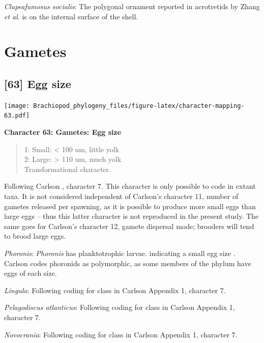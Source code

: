 \documentclass[]{book}
\theoremstyle{definition}
\theoremstyle{definition}
\theoremstyle{definition}
\theoremstyle{remark}
\begin{document}
\emph{Clupeafumosus socialis}: The polygonal ornament reported in
acrotretids by Zhang \emph{et al}. \citeyearpar{Zhang2016Epithelialcell}
is on the internal surface of the shell.

\hypertarget{gametes}{%
\section{Gametes}\label{gametes}}

\hypertarget{egg-size}{%
\subsection*{{[}63{]} Egg size}\label{egg-size}}

\texttt{[image: Brachiopod\_phylogeny\_files/figure-latex/character-mapping-63.pdf]}

\textbf{Character 63: Gametes: Egg size}

\begin{quote}
1: Small: \textless{} 100 um, little yolk\\
2: Large: \textgreater{} 110 um, much yolk\\
Transformational character.
\end{quote}

Following Carlson \citeyearpar{Carlson1995Phylogeneticrelationships},
character 7. This character is only possible to code in extant taxa. It
is not considered independent of Carlson's character 11, number of
gametes released per spawning, as it is possible to produce more small
eggs than large eggs -- thus this latter character is not reproduced in
the present study. The same goes for Carlson's character 12, gamete
dispersal mode; brooders will tend to brood large eggs.

\emph{Phoronis}: \emph{Phoronis} has planktotrophic larvae. indicating a
small egg size \citep{Ruppert2004}. Carlson
\citeyearpar{Carlson1995Phylogeneticrelationships} codes phoronids as
polymorphic, as some members of the phylum have eggs of each size.

\emph{Lingula}: Following coding for class in Carlson
\citeyearpar{Carlson1995Phylogeneticrelationships} Appendix 1, character
7.

\emph{Pelagodiscus atlanticus}: Following coding for class in Carlson
\citeyearpar{Carlson1995Phylogeneticrelationships} Appendix 1, character
7.

\emph{Novocrania}: Following coding for class in Carlson
\citeyearpar{Carlson1995Phylogeneticrelationships} Appendix 1, character
7.
\end{document}
